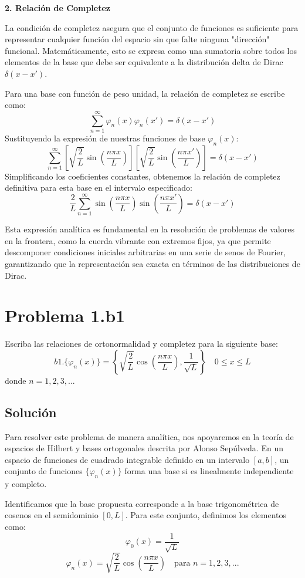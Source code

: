 \documentclass[a4paper]{article}
\begin{document}
\textbf{2. Relación de Completez}

La condición de completez asegura que el conjunto de funciones es suficiente para representar cualquier función del espacio sin que falte ninguna "dirección" funcional. Matemáticamente, esto se expresa como una sumatoria sobre todos los elementos de la base que debe ser equivalente a la distribución delta de Dirac $\delta(x - x')$.

Para una base con función de peso unidad, la relación de completez se escribe como:
$$ \sum_{n=1}^{\infty} \varphi_n(x) \varphi_n(x') = \delta(x - x') $$
Sustituyendo la expresión de nuestras funciones de base $\varphi_n(x)$:
$$ \sum_{n=1}^{\infty} \left[ \sqrt{\frac{2}{L}} \sin\left(\frac{n\pi x}{L}\right) \right] \left[ \sqrt{\frac{2}{L}} \sin\left(\frac{n\pi x'}{L}\right) \right] = \delta(x - x') $$
Simplificando los coeficientes constantes, obtenemos la relación de completez definitiva para esta base en el intervalo especificado:
$$ \frac{2}{L} \sum_{n=1}^{\infty} \sin\left(\frac{n\pi x}{L}\right) \sin\left(\frac{n\pi x'}{L}\right) = \delta(x - x') $$

Esta expresión analítica es fundamental en la resolución de problemas de valores en la frontera, como la cuerda vibrante con extremos fijos, ya que permite descomponer condiciones iniciales arbitrarias en una serie de senos de Fourier, garantizando que la representación sea exacta en términos de las distribuciones de Dirac.


\section{Problema 1.b1}
Escriba las relaciones de ortonormalidad y completez para la siguiente base:
$$ b1. \{\varphi_n(x)\} = \left\{\sqrt{\frac{2}{L}} \cos\left(\frac{n\pi x}{L}\right), \frac{1}{\sqrt{L}}\right\} \quad 0 \leq x \leq L $$
donde $n = 1, 2, 3, ...$

\subsection{Solución}

Para resolver este problema de manera analítica, nos apoyaremos en la teoría de espacios de Hilbert y bases ortogonales descrita por Alonso Sepúlveda. En un espacio de funciones de cuadrado integrable definido en un intervalo $[a, b]$, un conjunto de funciones $\{\varphi_n(x)\}$ forma una base si es linealmente independiente y completo. 

Identificamos que la base propuesta corresponde a la base trigonométrica de cosenos en el semidominio $[0, L]$. Para este conjunto, definimos los elementos como:
$$ \varphi_0(x) = \frac{1}{\sqrt{L}} $$
$$ \varphi_n(x) = \sqrt{\frac{2}{L}} \cos\left(\frac{n\pi x}{L}\right) \quad \text{para } n = 1, 2, 3, ... $$
\end{document}
